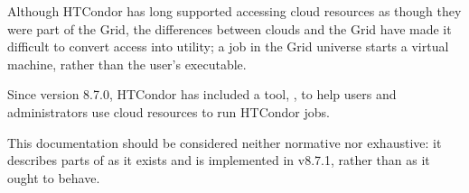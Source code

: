 Although HTCondor has long supported accessing cloud resources as though they
were part of the Grid, the differences between clouds and the Grid have
made it difficult to convert access into utility; a job in the Grid universe
starts a virtual machine, rather than the user's executable.

Since version 8.7.0, HTCondor has included a tool, , to help
users and administrators use cloud resources to run HTCondor jobs.

This documentation should be considered neither normative nor exhaustive:
it describes parts of  as it exists and is implemented
in v8.7.1, rather than as it ought to behave.









